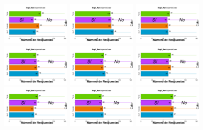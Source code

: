 \begin{figure}[th]
\centering
\includegraphics[width=0.30\textwidth]{Figures/BiasColor_Exp2_P1} \includegraphics[width=0.30\textwidth]{Figures/BiasColor_Exp2_P2} \includegraphics[width=0.30\textwidth]{Figures/BiasColor_Exp2_P3}
\includegraphics[width=0.30\textwidth]{Figures/BiasColor_Exp2_P4} \includegraphics[width=0.30\textwidth]{Figures/BiasColor_Exp2_P5} \includegraphics[width=0.30\textwidth]{Figures/BiasColor_Exp2_P6}
\includegraphics[width=0.30\textwidth]{Figures/BiasColor_Exp2_P7} \includegraphics[width=0.30\textwidth]{Figures/BiasColor_Exp2_P8} \includegraphics[width=0.30\textwidth]{Figures/BiasColor_Exp2_P9}

\end{figure}
